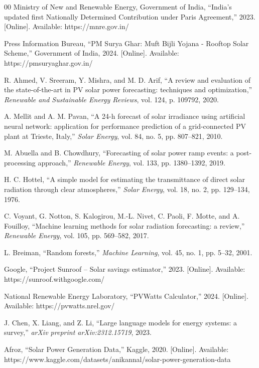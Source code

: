 \documentclass[conference]{IEEEtran}
\begin{document}
\begin{thebibliography}{00}
 Ministry of New and Renewable Energy, Government of India, ``India's updated first Nationally Determined Contribution under Paris Agreement,'' 2023. [Online]. Available: https://mnre.gov.in/

 Press Information Bureau, ``PM Surya Ghar: Muft Bijli Yojana - Rooftop Solar Scheme,'' Government of India, 2024. [Online]. Available: https://pmsuryaghar.gov.in/

 R. Ahmed, V. Sreeram, Y. Mishra, and M. D. Arif, ``A review and evaluation of the state-of-the-art in PV solar power forecasting: techniques and optimization,'' \textit{Renewable and Sustainable Energy Reviews}, vol. 124, p. 109792, 2020.

 A. Mellit and A. M. Pavan, ``A 24-h forecast of solar irradiance using artificial neural network: application for performance prediction of a grid-connected PV plant at Trieste, Italy,'' \textit{Solar Energy}, vol. 84, no. 5, pp. 807--821, 2010.

 M. Abuella and B. Chowdhury, ``Forecasting of solar power ramp events: a post-processing approach,'' \textit{Renewable Energy}, vol. 133, pp. 1380--1392, 2019.

 H. C. Hottel, ``A simple model for estimating the transmittance of direct solar radiation through clear atmospheres,'' \textit{Solar Energy}, vol. 18, no. 2, pp. 129--134, 1976.

 C. Voyant, G. Notton, S. Kalogirou, M.-L. Nivet, C. Paoli, F. Motte, and A. Fouilloy, ``Machine learning methods for solar radiation forecasting: a review,'' \textit{Renewable Energy}, vol. 105, pp. 569--582, 2017.

 L. Breiman, ``Random forests,'' \textit{Machine Learning}, vol. 45, no. 1, pp. 5--32, 2001.

 Google, ``Project Sunroof -- Solar savings estimator,'' 2023. [Online]. Available: https://sunroof.withgoogle.com/

 National Renewable Energy Laboratory, ``PVWatts Calculator,'' 2024. [Online]. Available: https://pvwatts.nrel.gov/

 J. Chen, X. Liang, and Z. Li, ``Large language models for energy systems: a survey,'' \textit{arXiv preprint arXiv:2312.15719}, 2023.

 Afroz, ``Solar Power Generation Data,'' Kaggle, 2020. [Online]. Available: https://www.kaggle.com/datasets/anikannal/solar-power-generation-data


\end{thebibliography}
\end{document}
